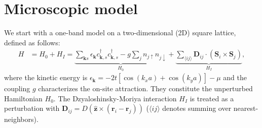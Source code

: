 \documentclass[11pt]{article}
\begin{document}
\section{Microscopic model}\label{sec:model}
We start with a one-band model on a two-dimensional (2D) square lattice, defined as follows:
\begin{align}\label{eq:H}
    H &= H_0 + H_I = \underbrace{\sum_{\bm k s} \epsilon_{\bm k} c^{\dagger}_{\bm{k},s}c^{\dagger}_{\bm{k},s} - g \sum_j n_{j \uparrow}n_{j \downarrow}}_{H_0} + \underbrace{\sum_{\langle ij \rangle} \bm D_{ij} \cdot (\bm S_i \times \bm S_j)}_{H_I},
\end{align}
where the kinetic energy is $\epsilon_{\bm k} = -2t [\cos(k_x a) + \cos(k_y a)] - \mu$
and the coupling $g$ characterizes the on-site attraction. They constitute the unperturbed
Hamiltonian $H_0$. The Dzyaloshinsky-Moriya interaction $H_I$ is treated as a perturbation with $\bm D_{ij} =
D({\hat{\bm z}} \times (\bm r_i - \bm r_j))$ ($\langle ij \rangle$ denotes summing over nearest-neighbors).
\end{document}
